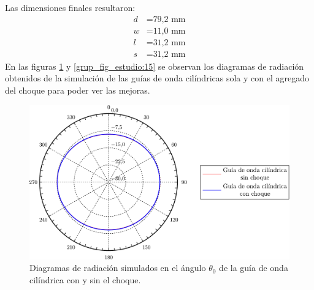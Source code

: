 Las dimensiones finales resultaron:
\begin{align*}
d &= \text{79,2 mm}\\
w &= \text{11,0 mm}\\
l &= \text{31,2 mm}\\
s &= \text{31,2 mm}
\end{align*}    
En las figuras \ref{fig_estudio:56} y \ref{grup_fig_estudio:15} se observan los diagramas de radiación obtenidos de la simulación de las guías de onda cilíndricas sola y con el agregado del choque para poder ver las mejoras.
\begin{figure}[H]
\centering
\includegraphics[scale = 0.5]{Figures/Estudio/estudio_56}
\caption{Diagramas de radiación simulados en el ángulo $\theta_0$ de la guía de onda cilíndrica con y sin el choque.}
\label{fig_estudio:56}
\end{figure}
